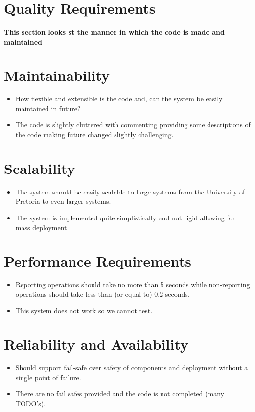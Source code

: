 \section{Quality Requirements}
\paragraph{This section looks st the manner in which the code is made and maintained}
\section{Maintainability}
	\begin{itemize}
		\item How flexible and extensible is the code and, can the system be easily maintained in future?
		\item The code is slightly cluttered with commenting providing some descriptions of the code making future changed slightly challenging.
	\end{itemize}
\section{Scalability}
	\begin{itemize}
		\item The system should be easily scalable to large systems from the University of Pretoria to even larger systems.
		\item The system is implemented quite simplistically and not rigid allowing for mass deployment
	\end{itemize}
\section{Performance Requirements}
	\begin{itemize}
		\item Reporting operations should take no more than 5 seconds while non-reporting operations should take less than (or equal to) 0.2 seconds.
		\item This system does not work so we cannot test.
	\end{itemize}
\section{Reliability and Availability}
	\begin{itemize}
		\item Should support fail-safe over safety of components and deployment without a single point of failure.
		\item There are no fail safes provided and the code is not completed (many TODO's).
	\end{itemize}
